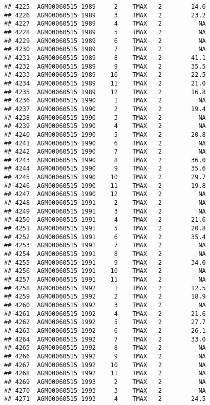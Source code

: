 \documentclass{article}\usepackage[]{graphicx}\usepackage[]{color}
\makeatletter
\newenvironment{kframe}{%
 \def\at@end@of@kframe{}%
 \ifinner\ifhmode%
  \def\at@end@of@kframe{\end{minipage}}%
  \begin{minipage}{\columnwidth}%
 \fi\fi%
 \def\FrameCommand##1{\hskip\@totalleftmargin \hskip-\fboxsep
 \colorbox{shadecolor}{##1}\hskip-\fboxsep
     \hskip-\linewidth \hskip-\@totalleftmargin \hskip\columnwidth}%
 \MakeFramed {\advance\hsize-\width
   \@totalleftmargin\z@ \linewidth\hsize
   \@setminipage}}%
 {\par\unskip\endMakeFramed%
 \at@end@of@kframe}
\newenvironment{knitrout}{}{} %
\makeatother
\begin{document}
\begin{knitrout}
\begin{kframe}
\begin{verbatim}
## 4225  AGM00060515 1989     2    TMAX   2        14.6
## 4226  AGM00060515 1989     3    TMAX   2        23.2
## 4227  AGM00060515 1989     4    TMAX   2          NA
## 4228  AGM00060515 1989     5    TMAX   2          NA
## 4229  AGM00060515 1989     6    TMAX   2          NA
## 4230  AGM00060515 1989     7    TMAX   2          NA
## 4231  AGM00060515 1989     8    TMAX   2        41.1
## 4232  AGM00060515 1989     9    TMAX   2        35.5
## 4233  AGM00060515 1989    10    TMAX   2        22.5
## 4234  AGM00060515 1989    11    TMAX   2        21.0
## 4235  AGM00060515 1989    12    TMAX   2        16.8
## 4236  AGM00060515 1990     1    TMAX   2          NA
## 4237  AGM00060515 1990     2    TMAX   2        19.4
## 4238  AGM00060515 1990     3    TMAX   2          NA
## 4239  AGM00060515 1990     4    TMAX   2          NA
## 4240  AGM00060515 1990     5    TMAX   2        20.8
## 4241  AGM00060515 1990     6    TMAX   2          NA
## 4242  AGM00060515 1990     7    TMAX   2          NA
## 4243  AGM00060515 1990     8    TMAX   2        36.0
## 4244  AGM00060515 1990     9    TMAX   2        35.6
## 4245  AGM00060515 1990    10    TMAX   2        29.7
## 4246  AGM00060515 1990    11    TMAX   2        19.8
## 4247  AGM00060515 1990    12    TMAX   2          NA
## 4248  AGM00060515 1991     2    TMAX   2          NA
## 4249  AGM00060515 1991     3    TMAX   2          NA
## 4250  AGM00060515 1991     4    TMAX   2        21.6
## 4251  AGM00060515 1991     5    TMAX   2        20.8
## 4252  AGM00060515 1991     6    TMAX   2        35.4
## 4253  AGM00060515 1991     7    TMAX   2          NA
## 4254  AGM00060515 1991     8    TMAX   2          NA
## 4255  AGM00060515 1991     9    TMAX   2        34.0
## 4256  AGM00060515 1991    10    TMAX   2          NA
## 4257  AGM00060515 1991    11    TMAX   2          NA
## 4258  AGM00060515 1992     1    TMAX   2        12.5
## 4259  AGM00060515 1992     2    TMAX   2        18.9
## 4260  AGM00060515 1992     3    TMAX   2          NA
## 4261  AGM00060515 1992     4    TMAX   2        21.6
## 4262  AGM00060515 1992     5    TMAX   2        27.7
## 4263  AGM00060515 1992     6    TMAX   2        26.1
## 4264  AGM00060515 1992     7    TMAX   2        33.0
## 4265  AGM00060515 1992     8    TMAX   2          NA
## 4266  AGM00060515 1992     9    TMAX   2          NA
## 4267  AGM00060515 1992    10    TMAX   2          NA
## 4268  AGM00060515 1992    11    TMAX   2          NA
## 4269  AGM00060515 1993     2    TMAX   2          NA
## 4270  AGM00060515 1993     3    TMAX   2          NA
## 4271  AGM00060515 1993     4    TMAX   2        24.5

\end{verbatim}
\end{kframe}
\end{knitrout}
\end{document}
